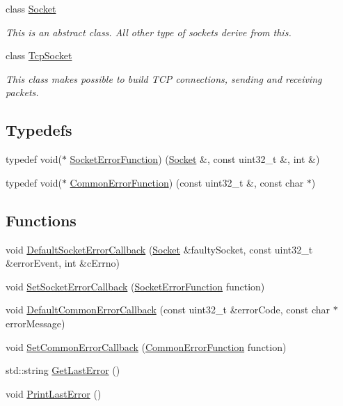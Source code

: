 \begin{DoxyCompactItemize}
class \hyperlink{classtnnf_1_1_socket}{Socket}
\begin{DoxyCompactList}\small\item\em This is an abstract class. All other type of sockets derive from this. \end{DoxyCompactList}\item 
class \hyperlink{classtnnf_1_1_tcp_socket}{Tcp\+Socket}
\begin{DoxyCompactList}\small\item\em This class makes possible to build T\+C\+P connections, sending and receiving packets. \end{DoxyCompactList}\end{DoxyCompactItemize}
\subsection*{Typedefs}
\begin{DoxyCompactItemize}
\item 
typedef void($\ast$ \hyperlink{namespacetnnf_ab346f9859b3d467cfa2b596cc075e954}{Socket\+Error\+Function}) (\hyperlink{classtnnf_1_1_socket}{Socket} \&, const uint32\+\_\+t \&, int \&)
\item 
typedef void($\ast$ \hyperlink{namespacetnnf_a8582fd7399bd6b4f1bc80f600e0dc889}{Common\+Error\+Function}) (const uint32\+\_\+t \&, const char $\ast$)
\end{DoxyCompactItemize}
\subsection*{Functions}
\begin{DoxyCompactItemize}
\item 
void \hyperlink{namespacetnnf_a21142ebedd6a5be7bfffd23787de2938}{Default\+Socket\+Error\+Callback} (\hyperlink{classtnnf_1_1_socket}{Socket} \&faulty\+Socket, const uint32\+\_\+t \&error\+Event, int \&c\+Errno)
\item 
void \hyperlink{namespacetnnf_a8d20067dede7c6002372c1f919c853e7}{Set\+Socket\+Error\+Callback} (\hyperlink{namespacetnnf_ab346f9859b3d467cfa2b596cc075e954}{Socket\+Error\+Function} function)
\item 
void \hyperlink{namespacetnnf_a38b2a35754cac26ac7f6e0ba5d56d880}{Default\+Common\+Error\+Callback} (const uint32\+\_\+t \&error\+Code, const char $\ast$error\+Message)
\item 
void \hyperlink{namespacetnnf_a5d18138a14d8e49215ffd2c09a7b6f59}{Set\+Common\+Error\+Callback} (\hyperlink{namespacetnnf_a8582fd7399bd6b4f1bc80f600e0dc889}{Common\+Error\+Function} function)
\item 
std\+::string \hyperlink{namespacetnnf_adfa355657ef15a2e12973ee06c8c12d3}{Get\+Last\+Error} ()
\item 
void \hyperlink{namespacetnnf_a84ecbdaf4059aa6036aebc5dcbe0c9fa}{Print\+Last\+Error} ()
\end{DoxyCompactItemize}
